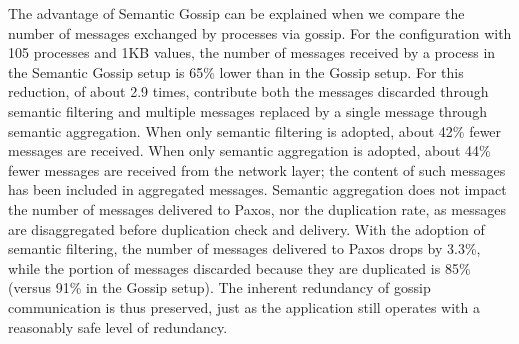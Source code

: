 The advantage of Semantic Gossip can be explained when we compare the number of
messages exchanged by processes via gossip.
%
For the configuration with 105 processes and 1KB values, the number of messages
received by a process in the Semantic Gossip setup is 65\% lower than in the Gossip
setup.
For this reduction, of about 2.9 times, contribute both the messages discarded
through semantic filtering and multiple messages replaced by a single message
through semantic aggregation.
When only semantic filtering is adopted, about 42\% fewer messages are received.
When only semantic aggregation is adopted, about 44\% fewer messages are
received from the network layer; the content of such messages has been included
in aggregated messages.
%
Semantic aggregation does not impact the number of messages delivered to Paxos,
nor the duplication rate, as messages are disaggregated before duplication
check and delivery.
With the adoption of semantic filtering, the number of messages delivered to
Paxos drops by 3.3\%, while the portion of messages discarded because they are
duplicated is 85\% (versus 91\% in the Gossip setup).
%
The inherent redundancy of gossip communication is thus preserved, just as the
application still operates with a reasonably safe level of redundancy.

